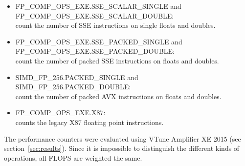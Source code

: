 \begin{itemize}
	\item FP\_COMP\_OPS\_EXE.SSE\_SCALAR\_SINGLE and \\FP\_COMP\_OPS\_EXE.SSE\_SCALAR\_DOUBLE:\\count the number of SSE instructions on single floats and doubles.
	\item FP\_COMP\_OPS\_EXE.SSE\_PACKED\_SINGLE and \\FP\_COMP\_OPS\_EXE.SSE\_PACKED\_DOUBLE:\\count the number of packed SSE instructions on floats and doubles.
	\item SIMD\_FP\_256.PACKED\_SINGLE and \\SIMD\_FP\_256.PACKED\_DOUBLE:\\count the number of packed AVX instructions on floats and doubles.
	\item FP\_COMP\_OPS\_EXE.X87:\\counts the legacy X87 floating point instructions.
\end{itemize}

The performance counters were evaluated using VTune Amplifier XE 2015 (see section~\ref{sec:results}).
Since it is impossible to distinguish the different kinds of operations, all FLOPS are weighted the same.


%
%
%
